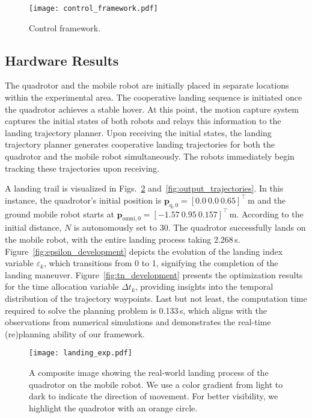 \documentclass[conference,preprint]{IEEEtran}
\begin{document}
\begin{figure}[htpb]
  \centering
  \texttt{[image: control\_framework.pdf]}
  \caption{Control framework.}
  \label{fig:control_framework}
\end{figure}

\subsection{Hardware Results}
\label{sec:real_world_result}

The quadrotor and the mobile robot are initially placed in separate locations within the experimental area. 
The cooperative landing sequence is initiated once the quadrotor achieves a stable hover. 
At this point, the motion capture system captures the initial states of both robots and relays this information to the landing trajectory planner.
Upon receiving the initial states, the landing trajectory planner generates cooperative landing trajectories for both the quadrotor and the mobile robot simultaneously. The robots immediately begin tracking these trajectories upon receiving.

A landing trail is visualized in Figs.~\ref{fig:landing_exp} and~\ref{fig:output_trajectories}. In this instance, the quadrotor's initial position is $\bm{p}_{\text{q},0}=[0.0\ 0.0\ 0.65]^\top$\,m and the ground mobile robot starts at $\bm{p}_{\text{omni},0}=[-1.57\ 0.95\ 0.157]^\top$\,m. According to the initial distance, $N$ is autonomously set to $30$.
The quadrotor successfully lands on the mobile robot, with the entire landing process taking 2.268\,s. Figure~\ref{fig:epsilon_development} depicts the evolution of the landing index variable $\varepsilon_k$, which transitions from 0 to 1, signifying the completion of the landing maneuver. 
Figure~\ref{fig:tn_development} presents the optimization results for the time allocation variable $\Delta t_k$, providing insights into the temporal distribution of the trajectory waypoints.
Last but not least, the computation time required to solve the planning problem is 0.133\,s, which aligns with the observations from numerical simulations and demonstrates the real-time (re)planning ability of our framework.

\begin{figure}[htpb]
  \centering
  \texttt{[image: landing\_exp.pdf]}
  \caption{A composite image showing the real-world landing process of the quadrotor on the mobile robot. We use a color gradient from light to dark to indicate the direction of movement. For better visibility, we highlight the quadrotor with an orange circle.}
  \label{fig:landing_exp}
\end{figure}
\end{document}
